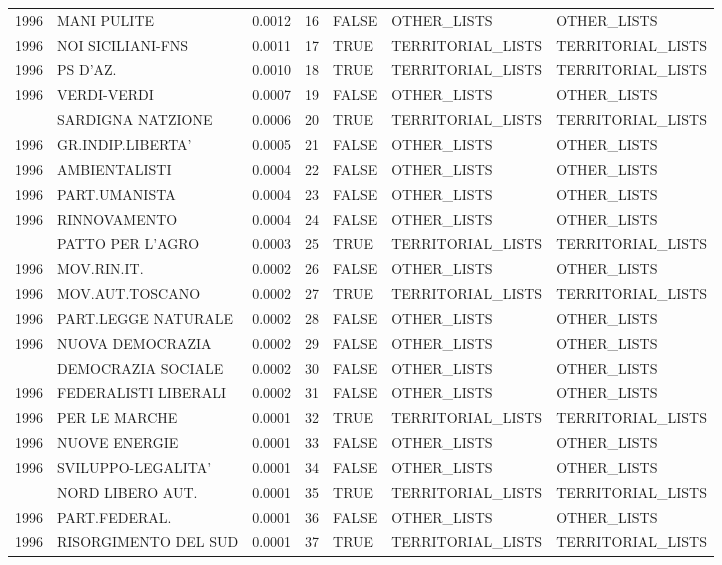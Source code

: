 \begin{longtable}[t]{rlrrlll}
1996 & MANI PULITE & 0.0012 & 16 & FALSE & OTHER\_LISTS & OTHER\_LISTS\\
1996 & NOI SICILIANI-FNS & 0.0011 & 17 & TRUE & TERRITORIAL\_LISTS & TERRITORIAL\_LISTS\\
1996 & PS D'AZ. & 0.0010 & 18 & TRUE & TERRITORIAL\_LISTS & TERRITORIAL\_LISTS\\
1996 & VERDI-VERDI & 0.0007 & 19 & FALSE & OTHER\_LISTS & OTHER\_LISTS\\
\addlinespace
1996 & SARDIGNA NATZIONE & 0.0006 & 20 & TRUE & TERRITORIAL\_LISTS & TERRITORIAL\_LISTS\\
1996 & GR.INDIP.LIBERTA' & 0.0005 & 21 & FALSE & OTHER\_LISTS & OTHER\_LISTS\\
1996 & AMBIENTALISTI & 0.0004 & 22 & FALSE & OTHER\_LISTS & OTHER\_LISTS\\
1996 & PART.UMANISTA & 0.0004 & 23 & FALSE & OTHER\_LISTS & OTHER\_LISTS\\
1996 & RINNOVAMENTO & 0.0004 & 24 & FALSE & OTHER\_LISTS & OTHER\_LISTS\\
\addlinespace
1996 & PATTO PER L'AGRO & 0.0003 & 25 & TRUE & TERRITORIAL\_LISTS & TERRITORIAL\_LISTS\\
1996 & MOV.RIN.IT. & 0.0002 & 26 & FALSE & OTHER\_LISTS & OTHER\_LISTS\\
1996 & MOV.AUT.TOSCANO & 0.0002 & 27 & TRUE & TERRITORIAL\_LISTS & TERRITORIAL\_LISTS\\
1996 & PART.LEGGE NATURALE & 0.0002 & 28 & FALSE & OTHER\_LISTS & OTHER\_LISTS\\
1996 & NUOVA DEMOCRAZIA & 0.0002 & 29 & FALSE & OTHER\_LISTS & OTHER\_LISTS\\
\addlinespace
1996 & DEMOCRAZIA SOCIALE & 0.0002 & 30 & FALSE & OTHER\_LISTS & OTHER\_LISTS\\
1996 & FEDERALISTI LIBERALI & 0.0002 & 31 & FALSE & OTHER\_LISTS & OTHER\_LISTS\\
1996 & PER LE MARCHE & 0.0001 & 32 & TRUE & TERRITORIAL\_LISTS & TERRITORIAL\_LISTS\\
1996 & NUOVE ENERGIE & 0.0001 & 33 & FALSE & OTHER\_LISTS & OTHER\_LISTS\\
1996 & SVILUPPO-LEGALITA' & 0.0001 & 34 & FALSE & OTHER\_LISTS & OTHER\_LISTS\\
\addlinespace
1996 & NORD LIBERO AUT. & 0.0001 & 35 & TRUE & TERRITORIAL\_LISTS & TERRITORIAL\_LISTS\\
1996 & PART.FEDERAL. & 0.0001 & 36 & FALSE & OTHER\_LISTS & OTHER\_LISTS\\
1996 & RISORGIMENTO DEL SUD & 0.0001 & 37 & TRUE & TERRITORIAL\_LISTS & TERRITORIAL\_LISTS\\

\end{longtable}
